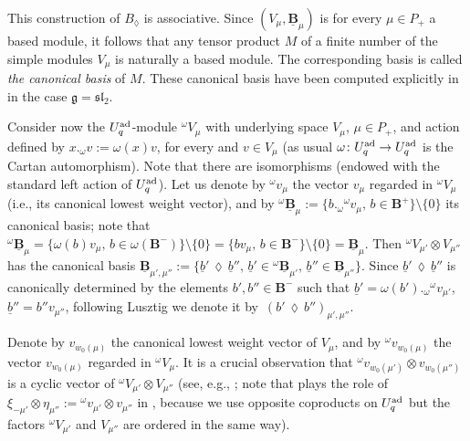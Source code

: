 \documentclass[pdftex]{sigma}
\numberwithin{equation}{section}
\theoremstyle{definition}
\newcommand{\ra}{\rightarrow}
\begin{document}
This construction of $B_{\lozenge}$ is associative. Since $(V_\mu, \underline{\mathbf{B}}_{\mu})$ is for every $\mu\in P_+$ a based module, it follows that any tensor product $M$ of a finite number of the simple modules $V_\mu$ is naturally a based module. The corresponding basis is called {\it the canonical basis} of $M$. These canonical basis have been computed explicitly in \cite{FK} in the case $\mathfrak{g}={\mathfrak{sl}_2}$.

Consider now the $U_q^{\rm ad}$-module ${}^{\omega}V_{\mu}$ with underlying space $V_{\mu}$, $\mu\in P_+$, and action defined by $x._{\omega} v := \omega(x)v$, for every  and $v\in V_{\mu}$ (as usual $\omega\colon U_q^{\rm ad} \ra U_q^{\rm ad}$ is the Cartan automorphism). Note that there are isomorphisms  (endowed with the standard left action of $U_q^{\rm ad}$). Let us denote by ${}^\omega v_\mu$ the vector $v_\mu$ regarded in ${}^{\omega}V_{\mu}$ (i.e., its canonical lowest weight vector), and by ${}^\omega\underline{\mathbf{B}}_{\mu}:=\{b._{\omega}{}^\omega v_{\mu},\, b\in \mathbf{B}^+\}\setminus \{0\}$ its canonical basis; note that ${}^\omega\underline{\mathbf{B}}_{\mu} = \{\omega(b){}v_{\mu},\, b\in \omega(\mathbf{B}^-)\}\setminus \{0\} = \{b v_{\mu},\, b\in \mathbf{B}^-\}\setminus \{0\} = \underline{\mathbf{B}}_{\mu}$. Then ${}^{\omega}V_{\mu'}\otimes V_{\mu''}$ has the canonical basis $\underline{\mathbf{B}}_{\mu',\mu''} := \{\underline{b}'\,\lozenge\, \underline{b}'', \, \underline{b}'\in {}^\omega\underline{\mathbf{B}}_{\mu'},\, \underline{b}''\in \underline{\mathbf{B}}_{\mu''}\}$. Since $\underline{b}'\,\lozenge\, \underline{b}''$ is canonically determined by the elements $b' ,b''\in \mathbf{B}^-$ such that $\underline{b}' = \omega(b')._{\omega} {}^\omega v_{\mu'}$, $\underline{b}'' = b''v_{\mu''}$, following Lusztig we denote it by~${(b' \,\lozenge\, b'')_{\mu',\mu''}}$.

 Denote by $v_{w_0(\mu)}$ the canonical lowest weight vector of $V_{\mu}$, and by ${}^\omega v_{w_0(\mu)}$ the vector $v_{w_0(\mu)}$ regarded in ${}^{\omega}V_{\mu}$. It is a crucial observation that ${}^\omega v_{w_0(\mu')}\otimes v_{w_0(\mu'')}$ is a cyclic vector of ${}^{\omega}V_{\mu'}\otimes V_{\mu''}$ (see, e.g., \cite[Proposition~23.3.6]{Lusztig}; note that  plays the role of $\xi_{-\mu'}\otimes \eta_{\mu''}:= {}^\omega v_{\mu'}\otimes v_{\mu''}$ in \cite{Lusztig}, because we use opposite coproducts on $U_q^{\rm ad}$ but the factors ${}^{\omega}V_{\mu'}$ and $V_{\mu''}$ are ordered in the same way).
\end{document}
